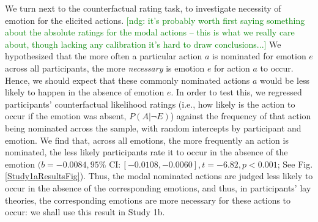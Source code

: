 \documentclass[10pt,letterpaper]{article}
\newcommand{\ndg}[1]{\textcolor{Green}{[ndg: #1]}}
\begin{document}
\begin{table}
\caption{ Action nominations from emotions (Study 1a). Top 5 responses for each emotion, with nomination counts in parentheses. The most common responses for anger were variants of ``hit X", where X is an object or person (of these, the modal response was: ``punched the wall"). }
\label{Study1aResultsTable}
\end{table}



We turn next to the counterfactual rating task, to investigate necessity of emotion for the elicited actions. 
\ndg{it's probably worth first saying something about the absolute ratings for the modal actions -- this is what we really care about, though lacking any calibration it's hard to draw conclusions...}
We hypothesized that the more often a particular action $a$ is nominated for emotion $e$ across all participants, the more \textit{necessary} is emotion $e$ for action $a$ to occur. Hence, we should expect that these commonly nominated actions $a$ would be less likely to happen in the absence of emotion $e$. In order to test this, we regressed participants' counterfactual likelihood ratings (i.e., how likely is the action to occur if the emotion was absent, $P(A | \neg E)$) against the frequency of that action being nominated across the sample, with random intercepts by participant and emotion. We find that, across all emotions, the more frequently an action is nominated, the less likely participants rate it to occur in the absence of the emotion $(b = -0.0084, 95\% \text{ CI}: [-0.0108, -0.0060], t=-6.82, p<0.001$; See Fig. \ref{Study1aResultsFig}). Thus, the modal nominated actions are judged less likely to occur in the absence of the corresponding emotions, and thus, in participants' lay theories, the corresponding emotions are more necessary for these actions to occur: we shall use this result in Study 1b.
\end{document}
